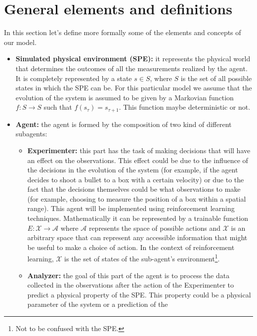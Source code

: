 \documentclass[11pt,a4paper,twoside]{report}
\newcommand{\+}{\textnormal{+} }
\theoremstyle{definition}
\numberwithin{equation}{chapter}
\begin{document}
\section{General elements and definitions}
In this section let's define more formally some of the elements and concepts of 
our model.
\begin{itemize}
    \item \textbf{Simulated physical environment (SPE): } it represents the
    physical world that determines the outcomes of all the measurements realized
    by the agent. It is completely represented by a state $ s \in S $, where $S$
    is the set of all possible states in which the SPE can be. For
    this particular model we assume that the evolution of the system is assumed
    to be given by a Markovian function $f: S \rightarrow S$ such that
    $f(s_\tau)=s_{\tau+1}$. This function maybe deterministic or not.
    \item \textbf{Agent:} the agent is formed by the composition of two kind 
    of different subagents:
    \begin{itemize}
        \item \textbf{Experimenter:} this part has the task of making decisions that
        will have an effect on the observations. This effect could be due to the
        influence of the decisions in the evolution of the system (for example,
        if the agent decides to shoot a bullet to a box with a certain velocity)
        or due to the fact that the decisions themselves could be what
        observations to make (for example, choosing to measure the position of a
        box within a spatial range). This agent will be implemented using
        reinforcement learning techniques. Mathematically it can be represented
        by a trainable function $E:\mathcal{X}\rightarrow\mathcal{A}$ where
        $\mathcal{A}$ represents the space of possible actions and $\mathcal{X}$
        is an arbitrary space that can represent any accessible information that
        might be useful to make a choice of action. In the context of 
        reinforcement learning, $\mathcal{X}$ is the set of states of the
        sub-agent's environment\footnote{Not to be confused with the SPE.}.
        \item \textbf{Analyzer:} the goal of this part of the agent is to
        process the data collected in the observations after the action of the
        Experimenter to predict a physical property of the SPE. This property
        could be a physical parameter of the system or a prediction of the

\end{itemize}
\end{itemize}
\end{document}
